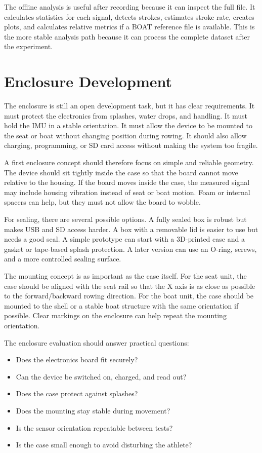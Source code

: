 The offline analysis is useful after recording because it can inspect the full file. It calculates statistics for each signal, detects strokes, estimates stroke rate, creates plots, and calculates relative metrics if a BOAT reference file is available. This is the more stable analysis path because it can process the complete dataset after the experiment.

\section{Enclosure Development}

The enclosure is still an open development task, but it has clear requirements. It must protect the electronics from splashes, water drops, and handling. It must hold the IMU in a stable orientation. It must allow the device to be mounted to the seat or boat without changing position during rowing. It should also allow charging, programming, or SD card access without making the system too fragile.

A first enclosure concept should therefore focus on simple and reliable geometry. The device should sit tightly inside the case so that the board cannot move relative to the housing. If the board moves inside the case, the measured signal may include housing vibration instead of seat or boat motion. Foam or internal spacers can help, but they must not allow the board to wobble.

For sealing, there are several possible options. A fully sealed box is robust but makes USB and SD access harder. A box with a removable lid is easier to use but needs a good seal. A simple prototype can start with a 3D-printed case and a gasket or tape-based splash protection. A later version can use an O-ring, screws, and a more controlled sealing surface.

The mounting concept is as important as the case itself. For the seat unit, the case should be aligned with the seat rail so that the X axis is as close as possible to the forward/backward rowing direction. For the boat unit, the case should be mounted to the shell or a stable boat structure with the same orientation if possible. Clear markings on the enclosure can help repeat the mounting orientation.

The enclosure evaluation should answer practical questions:

\begin{itemize}
  \item Does the electronics board fit securely?
  \item Can the device be switched on, charged, and read out?
  \item Does the case protect against splashes?
  \item Does the mounting stay stable during movement?
  \item Is the sensor orientation repeatable between tests?
  \item Is the case small enough to avoid disturbing the athlete?
\end{itemize}

